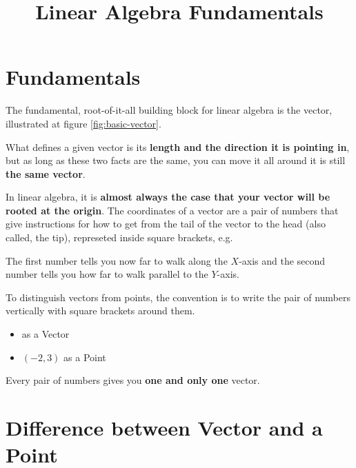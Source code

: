 \documentclass[12pt]{article}
\title{Linear Algebra Fundamentals}
\date{}
\begin{document}
    \maketitle

    \tableofcontents

\newpage

\section{Fundamentals}

The fundamental, root-of-it-all building block for linear algebra is the vector, illustrated at figure \ref{fig:basic-vector}.


What defines a given vector is its \textbf{length and the direction it is pointing in}, but as long as these two facts are the same, you can move it all around it is still \textbf{the same vector}.


In linear algebra, it is \textbf{almost always the case that your vector will be rooted at the origin}. The coordinates of a vector are a pair of numbers that give instructions for how to get from the tail of the vector to the head (also called, the tip), represeted inside square brackets, e.g. 

The first number tells you now far to walk along the \(X\)-axis and the second number tells you how far to walk parallel to the \(Y\)-axis.

To distinguish vectors from points, the convention is to write the pair of numbers vertically with square brackets around them.

\begin{itemize}
    \item {} as a Vector
    \item \( (-2, 3) \) as a Point
\end{itemize}

Every pair of numbers gives you \textbf{one and only one} vector.


\section{Difference between Vector and a Point}
\end{document}
